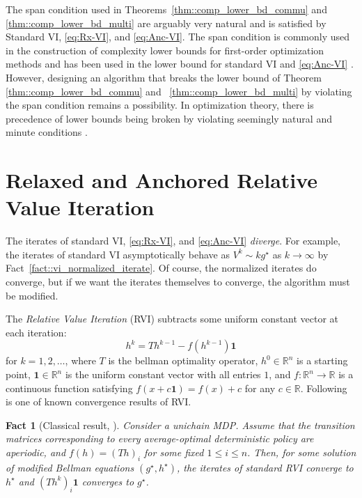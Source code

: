 \documentclass{article} %
\DeclareMathOperator*{\argmax}{arg\,max}
\newcommand{\cP}{\mathcal{P}}
\newcommand{\real}{\mathbb{R}}
\newtheorem{fact}{Fact}
\begin{document}
The span condition used in Theorems~\ref{thm::comp_lower_bd_commu} and \ref{thm::comp_lower_bd_multi} are arguably very natural and is satisfied by 
Standard VI, \ref{eq:Rx-VI}, and \ref{eq:Anc-VI}. The span condition is commonly used in the construction of complexity lower bounds for first-order optimization methods \citep{nesterov2003Introductory,drori2017exact,drori2022oracle,carmon2020stationary1, carmon2021stationary2,park2022exact} and has been used in the lower bound for standard VI and \ref{eq:Anc-VI} \citep{goyal2022first, lee2024accelerating}. However, designing an algorithm that breaks the lower bound of Theorem \ref{thm::comp_lower_bd_commu} and ~\ref{thm::comp_lower_bd_multi} by violating the span condition remains a possibility. In optimization theory, there is precedence of lower bounds being broken by violating seemingly natural and minute conditions \citep{hannah2018,golowich2020last,yoon2021accelerated}.

\section{Relaxed and Anchored Relative Value Iteration}\label{sec::RVI}
The iterates of standard VI, \ref{eq:Rx-VI}, and \ref{eq:Anc-VI}  \emph{diverge}. For example, the iterates of standard VI asymptotically behave as $V^k\sim k g^\star$ as $k\rightarrow\infty$ by Fact~\ref{fact::vi_normalized_iterate}. Of course, the normalized iterates do converge, but if we want the iterates themselves to converge, the algorithm must be modified.


The \emph{Relative Value Iteration} (RVI) subtracts some uniform constant vector at each iteration:
\[h^{k} = Th^{k-1} - f(h^{k-1})\mathbf{1}\] 
for $k=1,2,\dots$, where $T$ is the bellman optimality operator, $h^0\in \mathbb{R}^n$ is a starting point, $\mathbf{1}\in \mathbb{R}^n$ is the uniform constant vector with all entries $1$, and $f\colon  \real^n \rightarrow \real $ is a continuous function satisfying $f(x+c\mathbf{1})=f(x)+c$ for any $c \in \real$. Following is one of known convergence results of RVI.
\begin{fact}[Classical result, ]
Consider a unichain MDP. 
Assume that the transition matrices corresponding to every average-optimal deterministic policy are aperiodic, and $f(h) = (Th)_i$ for some fixed $1 \le i \le n$. Then, for some solution of modified Bellman equations $(g^{\star}, h^{\star})$, the iterates of standard RVI converge to $h^{\star}$ and $(Th^k)_i\mathbf{1}$ converges to $g^{\star}$.   
\end{fact}
\end{document}

